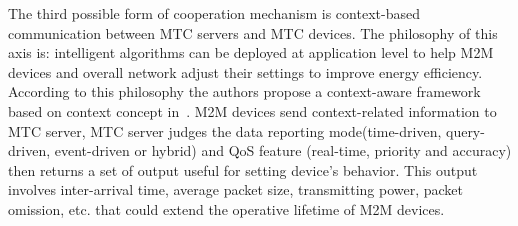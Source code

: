 The third possible form of cooperation mechanism is context-based communication between MTC servers and MTC devices.  The philosophy of this axis is: intelligent algorithms can be deployed at application level to help M2M devices and overall network adjust their settings to improve energy efficiency. 
According to this philosophy the authors propose a context-aware framework based on context concept in~\cite{Costa14}. 
M2M devices send context-related information to MTC server, MTC server judges the data reporting mode(time-driven, query-driven, event-driven or hybrid) and QoS feature (real-time, priority and accuracy) then returns a set of output useful for setting device's behavior. 
This output involves inter-arrival time, average packet size, transmitting power, packet omission, etc. that could extend the operative lifetime of M2M devices.
